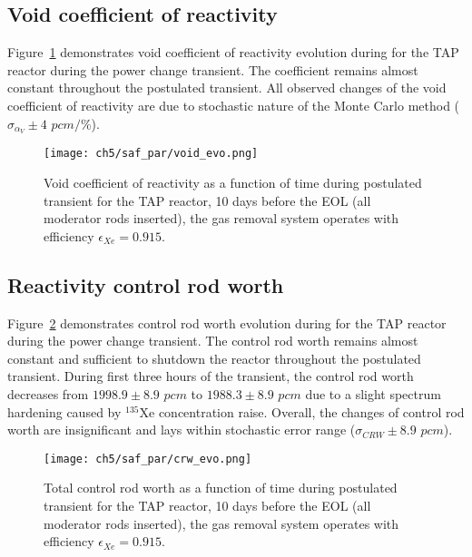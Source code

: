 \subsection{Void coefficient of reactivity}
Figure~\ref{fig:lf-tap-void-evo} demonstrates void coefficient of reactivity 
evolution during for the \gls{TAP} reactor during the power change transient. 
The coefficient remains almost constant throughout the postulated transient. 
All observed changes of the void coefficient of reactivity are due to 
stochastic nature of the Monte Carlo method ($\sigma_{\alpha_V}\pm4$ $pcm/$\%).
\begin{figure}[htp!] %
	\centering
	\texttt{[image: ch5/saf\_par/void\_evo.png]}
	\caption{Void coefficient of reactivity as a function of time during 
	postulated transient for the \gls{TAP} reactor, 10 days before the 
	\gls{EOL} (all moderator rods inserted), the gas removal system operates 
	with efficiency $\epsilon_{Xe}=0.915$.}
	\label{fig:lf-tap-void-evo}
\end{figure}

\subsection{Reactivity control rod worth}
Figure~\ref{fig:lf-tap-crw-evo} demonstrates control rod worth evolution 
during for the \gls{TAP} reactor during the power change transient. 
The control rod worth remains almost constant and sufficient to shutdown the 
reactor throughout the postulated transient. During first three hours of the 
transient, the control rod worth decreases from $1998.9\pm8.9$ $pcm$ to 
$1988.3\pm8.9$ $pcm$ due to a slight spectrum hardening caused by $^{135}$Xe 
concentration raise. Overall, the changes of control rod worth are 
insignificant and lays within stochastic error range 
($\sigma_{CRW}\pm8.9$ $pcm$).
\begin{figure}[htp!] %
	\centering
	\texttt{[image: ch5/saf\_par/crw\_evo.png]}
	\caption{Total control rod worth as a function of time during postulated 
	transient for the \gls{TAP} reactor, 10 days before the \gls{EOL} (all 
	moderator rods inserted), the gas removal system operates with efficiency 
	$\epsilon_{Xe}=0.915$.}
	\label{fig:lf-tap-crw-evo}
\end{figure}


